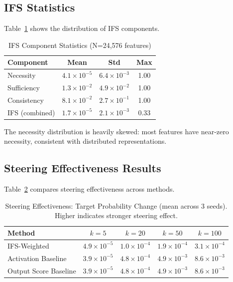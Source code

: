 \documentclass{article}
\begin{document}
\subsection{IFS Statistics}

Table~\ref{tab:ifs_stats} shows the distribution of IFS components.

\begin{table}[t]
\caption{IFS Component Statistics (N=24,576 features)}
\label{tab:ifs_stats}
\centering
\begin{tabular}{lccc}
\toprule
Component & Mean & Std & Max \\
\midrule
Necessity & $4.1 \times 10^{-5}$ & $6.4 \times 10^{-3}$ & 1.00 \\
Sufficiency & $1.3 \times 10^{-2}$ & $4.9 \times 10^{-2}$ & 1.00 \\
Consistency & $8.1 \times 10^{-2}$ & $2.7 \times 10^{-1}$ & 1.00 \\
\midrule
IFS (combined) & $1.7 \times 10^{-5}$ & $2.1 \times 10^{-3}$ & 0.33 \\
\bottomrule
\end{tabular}
\end{table}

The necessity distribution is heavily skewed: most features have near-zero necessity, consistent with distributed representations.

\subsection{Steering Effectiveness Results}

Table~\ref{tab:steering} compares steering effectiveness across methods.

\begin{table}[t]
\caption{Steering Effectiveness: Target Probability Change (mean across 3 seeds). Higher indicates stronger steering effect.}
\label{tab:steering}
\centering
\begin{tabular}{lcccc}
\toprule
Method & $k=5$ & $k=20$ & $k=50$ & $k=100$ \\
\midrule
IFS-Weighted & $4.9 \times 10^{-5}$ & $1.0 \times 10^{-4}$ & $1.9 \times 10^{-4}$ & $3.1 \times 10^{-4}$ \\
Activation Baseline & $3.9 \times 10^{-5}$ & $4.8 \times 10^{-4}$ & $4.9 \times 10^{-3}$ & $8.6 \times 10^{-3}$ \\
Output Score Baseline & $3.9 \times 10^{-5}$ & $4.8 \times 10^{-4}$ & $4.9 \times 10^{-3}$ & $8.6 \times 10^{-3}$ \\
\bottomrule
\end{tabular}
\end{table}
\end{document}
